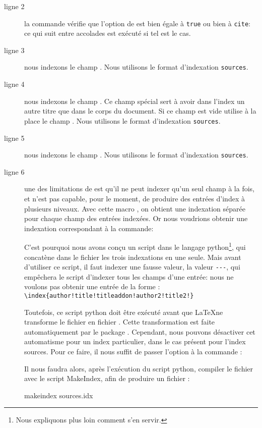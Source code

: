 \begin{description}
\item[ligne 2] la commande  vérifie que l'option  de  est bien égale à \verb|true| ou bien à \verb|cite|: ce qui suit entre accolades est exécuté si tel est le cas.
\item[ligne 3] nous indexons le champ .  Nous utilisons le format d'indexation \verb|sources|.
\item[ligne 4] nous indexons le champ . Ce champ spécial  sert à avoir dans l'index un autre titre que dans le corps du document. Si ce champ est vide  utilise à la place le champ . Nous utilisons le format d'indexation \verb|sources|.
\item[ligne 5] nous indexons le champ . Nous utilisons le format d'indexation \verb|sources|.
\item[ligne 6]  une des limitations de  est qu'il ne peut indexer qu'un seul champ à la fois, et n'est pas capable, pour le moment, de produire des entrées d'index à plusieurs niveaux. 
Avec cette macro , on obtient une indexation séparée pour chaque champ des entrées indexées. 
Or nous voudrions obtenir une indexation correspondant à la commande:
\begin{latexcode} 
\end{latexcode}
 C'est pourquoi nous avons conçu un script dans le langage python\footnote{Nous expliquons plus loin comment s'en servir.}, qui concatène dans le fichier  les trois indexations en une seule.
Mais avant d'utiliser ce script, il faut  indexer une fausse valeur, la valeur \verb|---|, qui empêchera le script d'indexer tous les champs d'une entrée: nous ne voulons pas obtenir une entrée de la forme : \\
 \verb|\index{author!title!titleaddon!author2!title2!}|
 
Toutefois, ce script python doit être exécuté avant que \LaTeX ne transforme le fichier  en fichier . Cette transformation est faite automatiquement par le package . Cependant, nous pouvons désactiver cet automatisme pour un index particulier, dans le cas présent pour l'index sources. Pour ce faire, il nous suffit de passer l'option  à la commande  :\label{noautomatic}

\begin{latexcode}
\makeindex[name=sources,title=Sources,noautomatic]
\end{latexcode}

Il nous faudra alors, après l'exécution du script python, compiler le fichier  avec le script MakeIndex, afin de produire un fichier  :
\begin{bashcode}
makeindex sources.idx
\end{bashcode}
\end{description}

